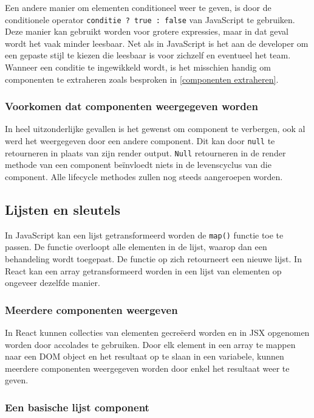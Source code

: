 Een andere manier om elementen conditioneel weer te geven, is door de conditionele operator \texttt{conditie ? true : false} van JavaScript te gebruiken. Deze manier kan gebruikt worden voor grotere expressies, maar in dat geval wordt het vaak minder leesbaar. Net als in JavaScript is het aan de developer om een gepaste stijl te kiezen die leesbaar is voor zichzelf en eventueel het team. Wanneer een conditie te ingewikkeld wordt, is het misschien handig om componenten te extraheren zoals besproken in \ref{componenten extraheren}. \autocite{React2019g}

\subsubsection{Voorkomen dat componenten weergegeven worden}

In heel uitzonderlijke gevallen is het gewenst om component te verbergen, ook al werd het weergegeven door een andere component. Dit kan door \texttt{null} te retourneren in plaats van zijn render output. \texttt{Null} retourneren in de render methode van een component beïnvloedt niets in de levenscyclus van die component. Alle lifecycle methodes zullen nog steeds aangeroepen worden. \autocite{React2019g}

\subsection{Lijsten en sleutels}

In JavaScript kan een lijst getransformeerd worden de \texttt{map()} functie toe te passen. De functie overloopt alle elementen in de lijst, waarop dan een behandeling wordt toegepast. De functie op zich retourneert een nieuwe lijst. In React kan een array getransformeerd worden in een lijst van elementen op ongeveer dezelfde manier. \autocite{React2019h}

\subsubsection{Meerdere componenten weergeven}

In React kunnen collecties van elementen gecreëerd worden en in JSX opgenomen worden door accolades te gebruiken. Door elk element in een array te mappen naar een DOM object en het resultaat op te slaan in een variabele, kunnen meerdere componenten weergegeven worden door enkel het resultaat weer te geven. \autocite{React2019h}

\subsubsection{Een basische lijst component}


